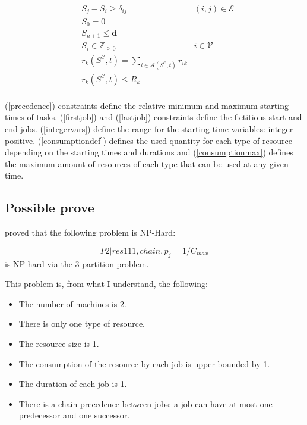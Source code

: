 \documentclass[a4paper,11pt]{article}
\begin{document}
    \begin{align}
        & S_j - S_i \geq \delta_{ij} & (i, j) \in \mathcal{E}  \label{precedence}\\
        & S_0 = 0 &  \label{firstjob}\\
        & S_{n+1} \leq \mathbf{d}   \label{lastjob}\\
        & S_{i} \in \mathbb{Z}_{\geq 0} & i \in \mathcal{V}  \label{integervars}\\
        & r_k(S^{\mathcal{C}}, t) = \sum_{i \in \mathcal{A}(S^{\mathcal{C}}, t)} r_{ik}  \label{consumptiondef}\\
        & r_k(S^{\mathcal{C}}, t) \leq R_k \label{consumptionmax}\\
    \end{align}

    (\ref{precedence}) constraints define the relative minimum and maximum starting times of tasks.
    (\ref{firstjob}) and (\ref{lastjob}) constraints define the fictitious start and end jobs.
    (\ref{integervars}) define the range for the starting time variables: integer positive.
    (\ref{consumptiondef}) defines the used quantity for each type of resource depending on the starting times and durations and (\ref{consumptionmax}) defines the maximum amount of resources of each type that can be used at any given time.

    \subsection{Possible prove}

    \cite{Blazewicz1983} proved that the following problem is NP-Hard:

    $$P2 | res111, chain, p_j = 1 / C_{max}$$ is NP-hard via the 3 partition problem.

    This problem is, from what I understand, the following:

    \begin{itemize}
        \item The number of machines is 2.
        \item There is only one type of resource.
        \item The resource size is 1.
        \item The consumption of the resource by each job is upper bounded by 1.
        \item The duration of each job is 1.
        \item There is a chain precedence between jobs: a job can have at most one predecessor and one successor.
    \end{itemize}
\end{document}
